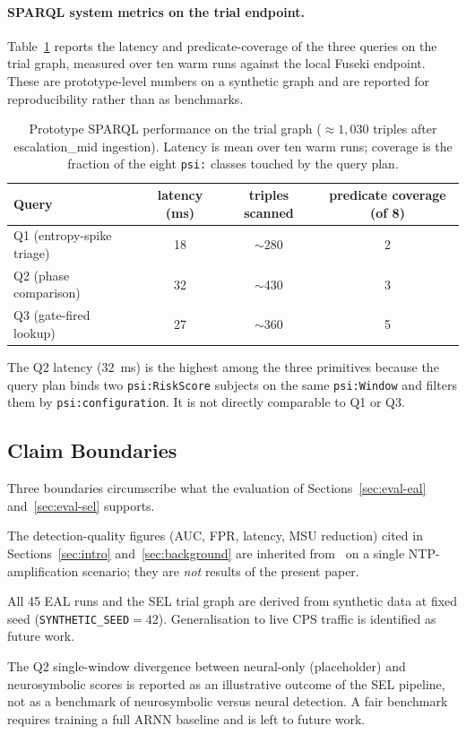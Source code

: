 \documentclass[runningheads]{llncs}
\begin{document}
\paragraph{SPARQL system metrics on the trial endpoint.}
Table~\ref{tab:sparql-perf} reports the latency and predicate-coverage
of the three queries on the trial graph, measured over ten warm
runs against the local Fuseki endpoint. These are
prototype-level numbers on a synthetic graph and are reported for
reproducibility rather than as benchmarks.

\begin{table}[t]
\centering
\caption{Prototype SPARQL performance on the trial graph
($\approx 1{,}030$ triples after escalation\_mid ingestion). Latency
is mean over ten warm runs; coverage is the fraction of the eight
\texttt{psi:} classes touched by the query plan.}
\label{tab:sparql-perf}
\small
\begin{tabular}{@{}lccc@{}}
\toprule
Query & latency (ms) & triples scanned & predicate coverage (of 8) \\
\midrule
Q1 (entropy-spike triage)   & 18 & $\sim$280  & 2 \\
Q2 (phase comparison)       & 32 & $\sim$430  & 3 \\
Q3 (gate-fired lookup)      & 27 & $\sim$360  & 5 \\
\bottomrule
\end{tabular}
\end{table}

\noindent
The Q2 latency (32~ms) is the highest among the three primitives because
the query plan binds two \texttt{psi:RiskScore} subjects on the same
\texttt{psi:Window} and filters them by \texttt{psi:configuration}. It
is not directly comparable to Q1 or Q3.

\subsection{Claim Boundaries}
\label{sec:claim-boundaries}

Three boundaries circumscribe what the evaluation of
Sections~\ref{sec:eval-eal} and~\ref{sec:eval-sel} supports.

\begin{description}[leftmargin=*,style=nextline]
\item[B1 (Inherited vs.\ new).] The detection-quality figures (AUC, FPR,
latency, MSU reduction) cited in Sections~\ref{sec:intro}
and~\ref{sec:background} are inherited from~\cite{paper3} on a single
NTP-amplification scenario; they are \emph{not} results of the present
paper.
\item[B2 (Synthetic vs.\ live).] All 45 EAL runs and the SEL trial graph
are derived from synthetic data at fixed seed
(\texttt{SYNTHETIC\_SEED}$=42$). Generalisation to live CPS traffic is
identified as future work.
\item[B3 (Illustrative vs.\ benchmark).] The Q2 single-window divergence
between neural-only (placeholder) and neurosymbolic scores is reported
as an illustrative outcome of the SEL pipeline, not as a benchmark of
neurosymbolic versus neural detection. A fair benchmark requires
training a full ARNN baseline and is left to future work.
\end{description}
\end{document}
